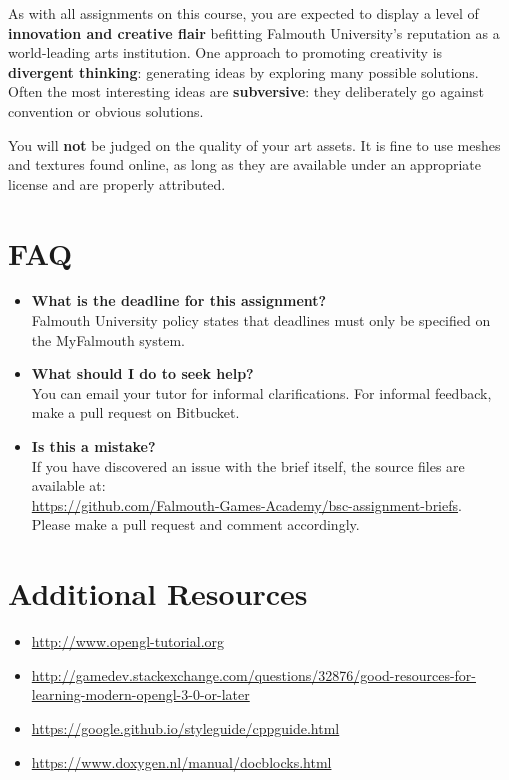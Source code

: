 \documentclass{../../fal_assignment}
\begin{document}
As with all assignments on this course, you are expected to display a level of
\textbf{innovation and creative flair} befitting Falmouth University's reputation as a world-leading
arts institution.
One approach to promoting creativity is
\textbf{divergent thinking}: generating ideas by exploring many possible solutions.
Often the most interesting ideas are \textbf{subversive}: they deliberately go against
convention or obvious solutions.

You will \textbf{not} be judged on the quality of your art assets.
It is fine to use meshes and textures found online,
as long as they are available under an appropriate license and are properly attributed.

\section*{FAQ}

\begin{itemize}
	\item 	\textbf{What is the deadline for this assignment?} \\ 
    		Falmouth University policy states that deadlines must only be specified on the MyFalmouth system.
    		
	\item 	\textbf{What should I do to seek help?} \\ 
    		You can email your tutor for informal clarifications. For informal feedback, make a pull request on Bitbucket. 
    		
    	\item 	\textbf{Is this a mistake?} \\ 	
    		If you have discovered an issue with the brief itself, the source files are available at: \\
    		\url{https://github.com/Falmouth-Games-Academy/bsc-assignment-briefs}.\\
    		 Please make a pull request and comment accordingly.
\end{itemize}

\section*{Additional Resources}

\begin{itemize}
    \item \url{http://www.opengl-tutorial.org}
    \item \url{http://gamedev.stackexchange.com/questions/32876/good-resources-for-learning-modern-opengl-3-0-or-later}
    \item \url{https://google.github.io/styleguide/cppguide.html}
    \item \url{https://www.doxygen.nl/manual/docblocks.html}
\end{itemize}
\end{document}
